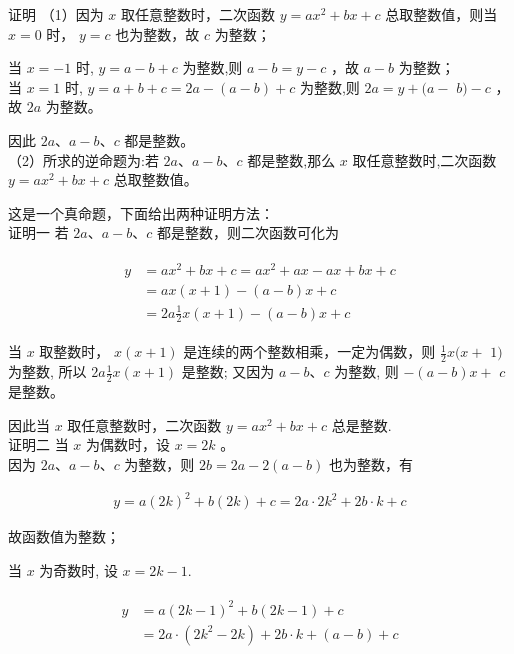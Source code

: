 \documentclass[10pt]{article}
\begin{document}
证明 （1）因为 $x$ 取任意整数时，二次函数 $y=a x^{2}+b x+c$ 总取整数值，则当 $x=0$ 时， $y=c$ 也为整数，故 $c$ 为整数；

当 $x=-1$ 时, $y=a-b+c$ 为整数,则 $a-b=y-c$ ，故 $a-b$ 为整数；\\
当 $x=1$ 时, $y=a+b+c=2 a-(a-b)+c$ 为整数,则 $2 a=y+(a-$ $b)-c$ ，故 $2 a$ 为整数。

因此 $2 a 、 a-b 、 c$ 都是整数。\\
（2）所求的逆命题为:若 $2 a 、 a-b 、 c$ 都是整数,那么 $x$ 取任意整数时,二次函数 $y=a x^{2}+b x+c$ 总取整数值。

这是一个真命题，下面给出两种证明方法：\\
证明一 若 $2 a 、 a-b 、 c$ 都是整数，则二次函数可化为

\begin{align*}
\begin{aligned}
y & =a x^{2}+b x+c=a x^{2}+a x-a x+b x+c \\
& =a x(x+1)-(a-b) x+c \\
& =2 a \frac{1}{2} x(x+1)-(a-b) x+c
\end{aligned}
\end{align*}

当 $x$ 取整数时， $x(x+1)$ 是连续的两个整数相乘，一定为偶数，则 $\frac{1}{2} x(x+$ $1)$ 为整数, 所以 $2 a \frac{1}{2} x(x+1)$ 是整数; 又因为 $a-b 、 c$ 为整数, 则 $-(a-b) x+$ $c$ 是整数。

因此当 $x$ 取任意整数时，二次函数 $y=a x^{2}+b x+c$ 总是整数.\\
证明二 当 $x$ 为偶数时，设 $x=2 k$ 。\\
因为 $2 a 、 a-b 、 c$ 为整数，则 $2 b=2 a-2(a-b)$ 也为整数，有

\begin{align*}
y=a(2 k)^{2}+b(2 k)+c=2 a \cdot 2 k^{2}+2 b \cdot k+c
\end{align*}

故函数值为整数；

当 $x$ 为奇数时, 设 $x=2 k-1$.

\begin{align*}
\begin{aligned}
y & =a(2 k-1)^{2}+b(2 k-1)+c \\
& =2 a \cdot\left(2 k^{2}-2 k\right)+2 b \cdot k+(a-b)+c
\end{aligned}
\end{align*}
\end{document}

